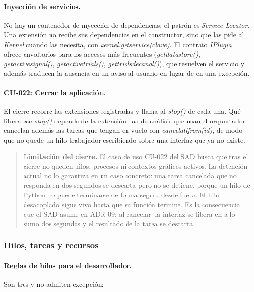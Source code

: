 \documentclass[12pt,letterpaper,oneside]{article}
\DeclareRobustCommand{\_}{\textunderscore\allowbreak}
\begin{document}
\paragraph{Inyección de servicios.} No hay un contenedor de inyección de dependencias: el patrón es \textit{Service Locator}. Una extensión no recibe sus dependencias en el constructor, sino que las pide al \textit{Kernel} cuando las necesita, con \textit{kernel.get\_service(clave)}. El contrato \textit{IPlugin} ofrece envoltorios para los accesos más frecuentes (\textit{get\_datastore()}, \textit{get\_active\_signal()}, \textit{get\_active\_trials()}, \textit{get\_trials\_de\_canal()}), que resuelven el servicio y además traducen la ausencia en un aviso al usuario en lugar de en una excepción.

\paragraph{CU-022: Cerrar la aplicación.} El cierre recorre las extensiones registradas y llama al \textit{stop()} de cada una. Qué libera ese \textit{stop()} depende de la extensión; las de análisis que usan el orquestador cancelan además las tareas que tengan en vuelo con \textit{cancel\_all\_from(id)}, de modo que no quede un hilo trabajador escribiendo sobre una interfaz que ya no existe.

\begin{quote}
\textbf{Limitación del cierre.} El caso de uso CU-022 del SAD busca que tras el cierre no queden hilos, procesos ni contextos gráficos activos. La detención actual no lo garantiza en un caso concreto: una tarea cancelada que no responda en dos segundos se descarta pero no se detiene, porque un hilo de Python no puede terminarse de forma segura desde fuera. El hilo desacoplado sigue vivo hasta que su función termine. Es la consecuencia que el SAD asume en ADR-09: al cancelar, la interfaz se libera en a lo sumo dos segundos y el resultado de la tarea se descarta.
\end{quote}

\subsubsection{Hilos, tareas y recursos}

\paragraph{Reglas de hilos para el desarrollador.} Son tres y no admiten excepción:
\end{document}
